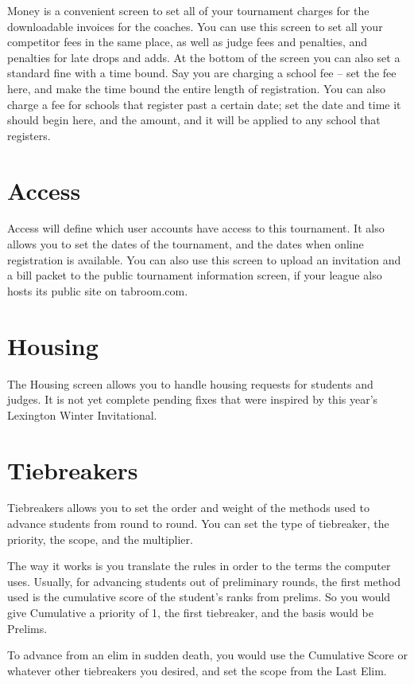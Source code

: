 \documentclass[12pt]{report} \usepackage {fullpage} \usepackage{times}
\begin{document}
Money is a convenient screen to set all of your tournament charges for the
downloadable invoices for the coaches.   You can use this screen to set all
your competitor fees in the same place, as well as judge fees and
penalties, and penalties for late drops and adds.   At the bottom of the
screen you can also set a standard fine with a time bound.  Say you are
charging a school fee -- set the fee here, and make the time bound the
entire length of registration.   You can also charge a fee for schools that
register past a certain date; set the date and time it should begin here,
and the amount, and it will be applied to any school that registers.

 	
\section{Access}

Access will define which user accounts have access to this tournament.  It
also allows you to set the dates of the tournament, and the dates when
online registration is available.   You can also use this screen to upload
an invitation and a bill packet to the public tournament information
screen, if your league also hosts its public site on tabroom.com.

 	
\section{Housing}

The Housing screen allows you to handle housing requests for students and
judges.  It is not yet complete pending fixes that were inspired by this
year's Lexington Winter Invitational. 

 	
\section{Tiebreakers}

Tiebreakers allows you to set the order and weight of the methods used to
advance students from round to round.   You can set the type of tiebreaker,
the priority, the scope, and the multiplier.

The way it works is you translate the rules in order to the terms the
computer uses.   Usually, for advancing students out of preliminary rounds,
the first method used is the cumulative score of the student's ranks from
prelims.   So you would give Cumulative a priority of 1, the first
tiebreaker, and the basis would be Prelims.

To advance from an elim in sudden death, you would use the Cumulative Score
or whatever other tiebreakers you desired, and set the scope from the Last
Elim.
\end{document}
